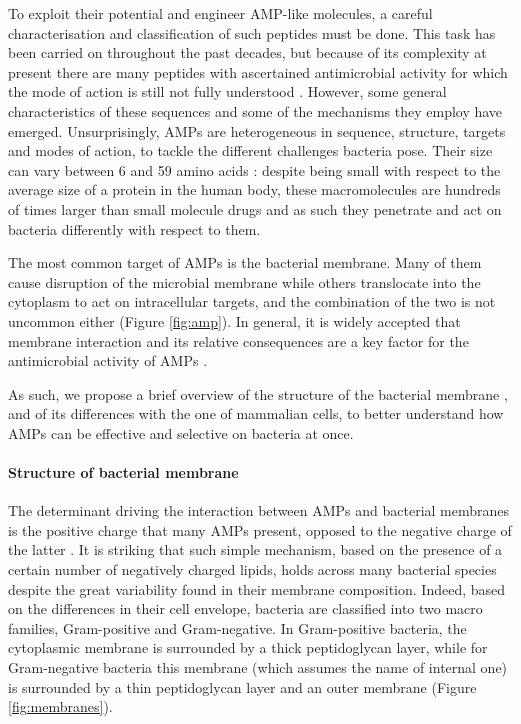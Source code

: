 To exploit their potential and engineer AMP-like molecules, a careful characterisation and classification of such peptides must be done. This task has been carried on throughout the past decades, but because of its complexity at present there are many peptides with ascertained antimicrobial activity for which the mode of action is still not fully understood \citep{Ebbensgaard2015}. However, some general characteristics of these sequences and some of the mechanisms they employ have emerged.
%
Unsurprisingly, AMPs are heterogeneous in  sequence, structure, targets and modes of action, to tackle the different challenges bacteria pose. Their size can vary between 6 and 59 amino acids \citep{Brogden2005}: despite being small with respect to the average size of a protein in the human body, these macromolecules are hundreds of times larger than small molecule drugs and as such they penetrate and act on bacteria differently with respect to them.

The most common target of AMPs is the bacterial membrane. Many of them cause disruption of the microbial membrane while others translocate into the cytoplasm to act on intracellular targets, and the combination of the two is not uncommon either \citep{Hancock2006} (Figure \ref{fig:amp}). In general, it is widely accepted that membrane interaction and its relative consequences are a key factor for the antimicrobial activity of AMPs \citep{Nguyen2011}.

As such, we propose a brief overview of the structure of the bacterial membrane \citep{Silhavy2010}, and of its differences with the one of mammalian cells, to better understand how AMPs can be effective and selective on bacteria at once.


\paragraph{Structure of bacterial membrane}
The determinant driving the interaction between AMPs and bacterial membranes is the positive charge that many AMPs present, opposed to the negative charge of the latter \citep{Nguyen2011,Mahlapuu2016}.
%
It is striking that such simple mechanism, based on the presence of a certain number of negatively charged lipids, holds across many bacterial species despite the great variability found in their membrane composition.
%
Indeed, based on the differences in their cell envelope, bacteria are classified into two macro families, Gram-positive and Gram-negative.
%
In Gram-positive bacteria, the cytoplasmic membrane is surrounded by a thick peptidoglycan layer, while for Gram-negative bacteria this membrane (which assumes the name of internal one) is surrounded by a thin peptidoglycan layer and an outer membrane \citep{Silhavy2010,Lin2016} (Figure \ref{fig:membranes}).

